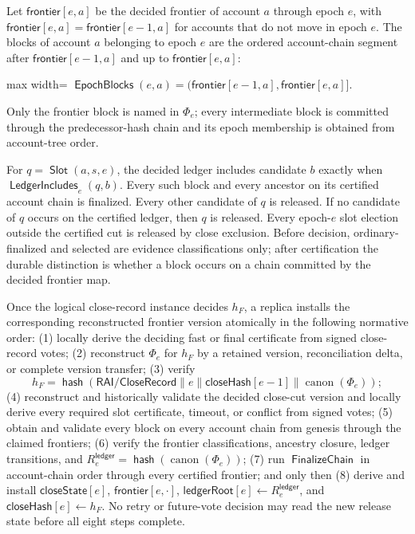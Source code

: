 \documentclass[sigplan,twocolumn,review,anonymous]{acmart}
\newcommand{\func}[1]{\operatorname{\mathsf{#1}}}
\newcommand{\hash}{\func{hash}}
\newcommand{\Slot}{\func{Slot}}
\newcommand{\frontier}{\mathsf{frontier}}
\newcommand{\ledgerRoot}{\mathsf{ledgerRoot}}
\newcommand{\closeHash}{\mathsf{closeHash}}
\newcommand{\EpochBlocks}{\func{EpochBlocks}}
\newcommand{\FinalizeChain}{\func{FinalizeChain}}
\newcommand{\closeState}{\mathsf{closeState}}
\begin{document}
Let \(\frontier[e,a]\) be the decided frontier of account \(a\) through epoch \(e\), with
\(\frontier[e,a]=\frontier[e-1,a]\) for accounts that do not move in epoch \(e\).  The blocks of
account \(a\) belonging to epoch \(e\) are the ordered account-chain segment after
\(\frontier[e-1,a]\) and up to \(\frontier[e,a]\):
\begin{center}
\begin{adjustbox}{max width=\columnwidth}
\(\displaystyle
\EpochBlocks(e,a)=
(\frontier[e-1,a],\frontier[e,a]] .
\)
\end{adjustbox}
\end{center}
Only the frontier block is named in \(\Phi_e\); every intermediate block is committed through the
predecessor-hash chain and its epoch membership is obtained from account-tree order.

For \(q=\Slot(a,s,e)\), the decided ledger includes candidate \(b\) exactly when
\(\func{LedgerIncludes}_e(q,b)\).  Every such block and every ancestor on its certified account chain
is finalized.  Every other candidate of \(q\) is released.  If no candidate of \(q\) occurs on the
certified ledger, then \(q\) is released.  Every epoch-\(e\) slot election outside the certified cut
is released by close exclusion.  Before decision, ordinary-finalized and selected are evidence
classifications only; after certification the durable distinction is whether a block occurs on a chain
committed by the decided frontier map.

Once the logical close-record instance decides \(h_F\), a replica installs the corresponding
reconstructed frontier version atomically in the following normative order: (1) locally derive the
deciding fast or final certificate from signed close-record votes; (2) reconstruct \(\Phi_e\) for \(h_F\) by a
retained version, reconciliation delta, or complete version transfer; (3) verify
\[
h_F=\hash(\mathsf{RAI/CloseRecord}\parallel e\parallel\closeHash[e-1]
\parallel\operatorname{canon}(\Phi_e));
\]
(4) reconstruct and historically validate the decided close-cut version and locally derive every required
slot certificate, timeout, or conflict from signed votes; (5) obtain and validate every block on every account
chain from genesis through the claimed frontiers; (6) verify the frontier classifications, ancestry
closure, ledger transitions, and \(R^{\mathsf{ledger}}_e=\hash(\operatorname{canon}(\Phi_e))\); (7)
run \(\FinalizeChain\) in account-chain order through every certified frontier; and only then (8)
derive and install \(\closeState[e]\), \(\frontier[e,\cdot]\),
\(\ledgerRoot[e]\gets R^{\mathsf{ledger}}_e\), and \(\closeHash[e]\gets h_F\).  No retry or
future-vote decision may read the new release state before all eight steps complete.
\end{document}
